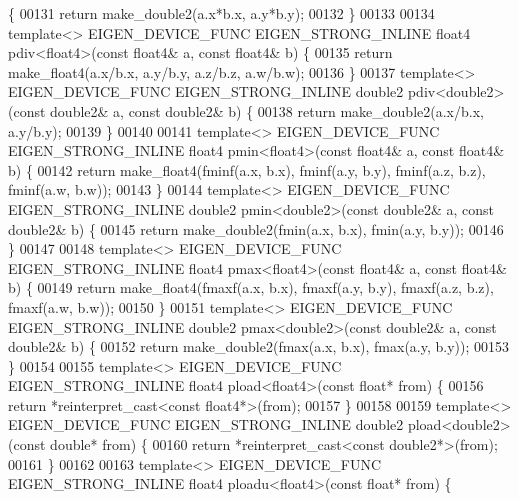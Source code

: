 \begin{DoxyCode}
      \{
00131   \textcolor{keywordflow}{return} make\_double2(a.x*b.x, a.y*b.y);
00132 \}
00133 
00134 \textcolor{keyword}{template}<> EIGEN\_DEVICE\_FUNC EIGEN\_STRONG\_INLINE float4 pdiv<float4>(\textcolor{keyword}{const} float4& a, \textcolor{keyword}{const} float4& b) \{
00135   \textcolor{keywordflow}{return} make\_float4(a.x/b.x, a.y/b.y, a.z/b.z, a.w/b.w);
00136 \}
00137 \textcolor{keyword}{template}<> EIGEN\_DEVICE\_FUNC EIGEN\_STRONG\_INLINE double2 pdiv<double2>(\textcolor{keyword}{const} double2& a, \textcolor{keyword}{const} double2& b) 
      \{
00138   \textcolor{keywordflow}{return} make\_double2(a.x/b.x, a.y/b.y);
00139 \}
00140 
00141 \textcolor{keyword}{template}<> EIGEN\_DEVICE\_FUNC EIGEN\_STRONG\_INLINE float4 pmin<float4>(\textcolor{keyword}{const} float4& a, \textcolor{keyword}{const} float4& b) \{
00142   \textcolor{keywordflow}{return} make\_float4(fminf(a.x, b.x), fminf(a.y, b.y), fminf(a.z, b.z), fminf(a.w, b.w));
00143 \}
00144 \textcolor{keyword}{template}<> EIGEN\_DEVICE\_FUNC EIGEN\_STRONG\_INLINE double2 pmin<double2>(\textcolor{keyword}{const} double2& a, \textcolor{keyword}{const} double2& b) 
      \{
00145   \textcolor{keywordflow}{return} make\_double2(fmin(a.x, b.x), fmin(a.y, b.y));
00146 \}
00147 
00148 \textcolor{keyword}{template}<> EIGEN\_DEVICE\_FUNC EIGEN\_STRONG\_INLINE float4 pmax<float4>(\textcolor{keyword}{const} float4& a, \textcolor{keyword}{const} float4& b) \{
00149   \textcolor{keywordflow}{return} make\_float4(fmaxf(a.x, b.x), fmaxf(a.y, b.y), fmaxf(a.z, b.z), fmaxf(a.w, b.w));
00150 \}
00151 \textcolor{keyword}{template}<> EIGEN\_DEVICE\_FUNC EIGEN\_STRONG\_INLINE double2 pmax<double2>(\textcolor{keyword}{const} double2& a, \textcolor{keyword}{const} double2& b) 
      \{
00152   \textcolor{keywordflow}{return} make\_double2(fmax(a.x, b.x), fmax(a.y, b.y));
00153 \}
00154 
00155 \textcolor{keyword}{template}<> EIGEN\_DEVICE\_FUNC EIGEN\_STRONG\_INLINE float4 pload<float4>(\textcolor{keyword}{const} \textcolor{keywordtype}{float}* from) \{
00156   \textcolor{keywordflow}{return} *\textcolor{keyword}{reinterpret\_cast<}\textcolor{keyword}{const }float4*\textcolor{keyword}{>}(from);
00157 \}
00158 
00159 \textcolor{keyword}{template}<> EIGEN\_DEVICE\_FUNC EIGEN\_STRONG\_INLINE double2 pload<double2>(\textcolor{keyword}{const} \textcolor{keywordtype}{double}* from) \{
00160   \textcolor{keywordflow}{return} *\textcolor{keyword}{reinterpret\_cast<}\textcolor{keyword}{const }double2*\textcolor{keyword}{>}(from);
00161 \}
00162 
00163 \textcolor{keyword}{template}<> EIGEN\_DEVICE\_FUNC EIGEN\_STRONG\_INLINE float4 ploadu<float4>(\textcolor{keyword}{const} \textcolor{keywordtype}{float}* from) \{

\end{DoxyCode}
